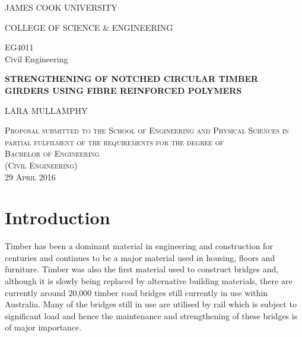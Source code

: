 \documentclass[11pt,a4paper]{article}
\numberwithin{equation}{subsection}
\DeclareRobustCommand\nocite[1]{%
	{\def\cite##1{\ignorespaces}#1}}
\newcommand*{\titleGP}{\begingroup %
	\centering %
	\vspace*{\baselineskip} %
	
	
	{\Large JAMES COOK UNIVERSITY\\ [0.3\baselineskip] } %
	
	{\Huge COLLEGE OF SCIENCE \&{} ENGINEERING\\ [0.3\baselineskip] } %
	
	\vspace*{7\baselineskip} %
	
	{\Huge EG4011\\ Civil Engineering\\ [0.3\baselineskip] } %
	
	\vspace*{6\baselineskip} %
	
	{\Huge \bf{STRENGTHENING OF NOTCHED CIRCULAR TIMBER GIRDERS USING FIBRE REINFORCED POLYMERS}\\ [0.3\baselineskip] } %
	
	\vspace*{2\baselineskip} %
	
	{\LARGE LARA MULLAMPHY\par} %

	
	\vfill %
	
	
		\scshape %
		Proposal submitted to the School of Engineering and Physical Sciences in partial fulfilment of the requirements for the degree of \\
		{\Large Bachelor of Engineering\\ (Civil Engineering)} %
		\\[\baselineskip] %
		29 April 2016\par %
	
	\endgroup}
\begin{document}
	\titleGP %

	
	\pagestyle{fancy}
	\fancyhead{}
	\fancyfoot{}
	\renewcommand{\headrulewidth}{0pt}
	\fancyfoot[R]{\thepage}
	\pagebreak



	\tableofcontents
	\vspace*{\baselineskip}
	\vspace*{\baselineskip}
	
	\pagebreak

	\nocite\listoffigures 
	\listoftables
	\pagebreak
	
	\section{Introduction}
	
	\setcounter{page}{1}

	
	\noindent
	Timber has been a dominant material in engineering and construction for centuries and continues to be a major material used in housing, floors and furniture. Timber was also the first material used to construct bridges and, although it is slowly being replaced by alternative building materials, there are currently around 20,000 timber road bridges still currently in use within Australia. Many of the bridges still in use are utilised by rail \cite{wilkinson_capacity_2008} which is subject to significant load and hence the maintenance and strengthening of these bridges is of major importance. 
    
    \vspace*{\baselineskip}
    
\end{document}
